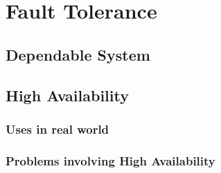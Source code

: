 \section{Fault Tolerance}
\subsection{Dependable System}
\subsection{High Availability}
\subsubsection{Uses in real world}
\subsubsection{Problems involving High Availability}

